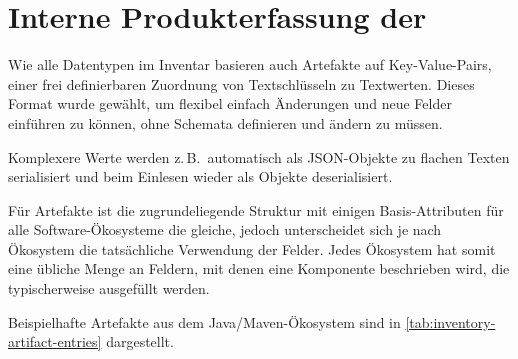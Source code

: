 \section{Interne Produkterfassung der \metaeffektlg}\label{sec:metaeffekt-inventory-format}

Wie alle Datentypen im Inventar basieren auch Artefakte auf Key-Value-Pairs, einer frei definierbaren Zuordnung von Textschlüsseln zu Textwerten.
Dieses Format wurde gewählt, um flexibel einfach Änderungen und neue Felder einführen zu können, ohne Schemata definieren und ändern zu müssen.

Komplexere Werte werden z.\,B.\ automatisch als JSON-Objekte zu flachen Texten serialisiert und beim Einlesen wieder als Objekte deserialisiert.

Für Artefakte ist die zugrundeliegende Struktur mit einigen Basis-Attributen für alle Software-Ökosysteme die gleiche, jedoch unterscheidet sich je nach Ökosystem die tatsächliche Verwendung der Felder.
Jedes Ökosystem hat somit eine übliche Menge an Feldern, mit denen eine Komponente beschrieben wird, die typischerweise ausgefüllt werden.

Beispielhafte Artefakte aus dem Java/Maven-Ökosystem sind in \autoref{tab:inventory-artifact-entries} dargestellt.

\begin{table}[ht]
    \centering
    \caption{Beispielhafte Artefakteinträge in einem Software-Inventar}
    \label{tab:inventory-artifact-entries}
\end{table}

